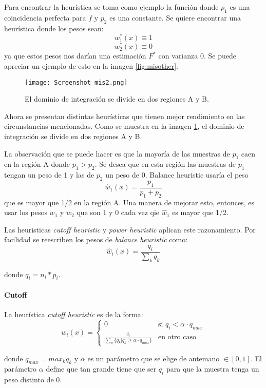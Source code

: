 \documentclass{article}
\begin{document}
Para encontrar la heurística se toma como ejemplo la función donde $p_{1}$ es una coincidencia perfecta para $f$ y $p_{2}$ es una constante.
Se quiere encontrar una heurística donde los pesos sean:
$$w^{*}_{1}(x) \equiv 1$$
$$w^{*}_{2}(x) \equiv 0$$
ya que estos pesos nos darían una estimación $F^{*}$ con varianza 0.
Se puede apreciar un ejemplo de esto en la imagen \ref{fig:misother}.

\begin{figure}[H]
\centering
\texttt{[image: Screenshot\_mis2.png]}
\caption{El dominio de integración se divide en dos regiones A y B.}
\label{fig:misother2}
\end{figure}

Ahora se presentan distintas heurísticas que tienen mejor rendimiento en las circunstancias mencionadas.
Como se muestra en la imagen \ref{fig:misother2}, el dominio de integración se divide en dos regiones A y B.

La observación que se puede hacer es que la mayoría de las muestras de $p_{1}$ caen en la región A donde $p_{1} > p_{2}$.
Se desea que en esta región las muestras de $p_{1}$ tengan un peso de 1 y las de $p_{2}$ un peso de 0.
Balance heuristic usaría el peso
$$ \hat{w}_{1}(x) = \frac{p_1}{p_1 + p_2} $$
que es mayor que 1/2 en la región A. Una manera de mejorar esto, entonces, es usar los pesos $w_{1}$ y $w_{2}$ que son 1 y 0 cada vez qie $\hat{w}_{1}$ es mayor que 1/2.

Las heuristicas \textit{cutoff heuristic} y \textit{power heuristic} aplican este razonamiento.
Por facilidad se reescriben los pesos de \textit{balance heuristic} como:
$$ \hat{w}_{i}(x) = \frac{q_{i}}{\sum_{k} q_{k}} $$

donde $q_{i} = n_{i} * p_{i}$.

\paragraph{Cutoff} La heurística \textit{cutoff heuristic} es de la forma:
$$ w_{i}(x) = \begin{cases} 0 & \text{si } q_{i} < \alpha \cdot q_{max} \\ \frac{q_{i}}{\sum_{k} \{ q_{k} | q_{k} \geq \alpha \cdot q_{max} \}} & \text{en otro caso} \end{cases}$$

donde $q_{max} = max_{k} q_{k}$ y $\alpha$ es un parámetro que se elige de antemano $\in [0, 1]$.
El parámetro $\alpha$ define que tan grande tiene que ser $q_{i}$ para que la muestra tenga un peso distinto de 0.
\end{document}
